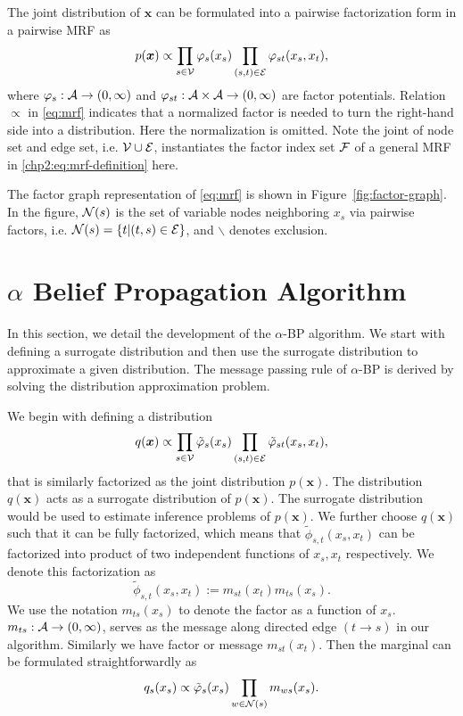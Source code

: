 The joint distribution of $\bm{x}$ can be formulated into a pairwise factorization form in a pairwise MRF as
\begin{equation}\label{eq:mrf}
  p(\bm{x}) \propto \prod_{{s\in \mathcal{V}}} \varphi_s(x_s) \prod_{(s,t) \in \mathcal{E}} \varphi_{st}(x_s, x_t),
\end{equation}
where $\varphi_{s}: \mathcal{A} \rightarrow (0, \infty)$ and $\varphi_{st}: \mathcal{A} \times \mathcal{A} \rightarrow (0, \infty)$ are factor potentials. Relation $\propto$ in \eqref{eq:mrf} indicates that a normalized factor is needed to turn the right-hand side into a distribution. Here the normalization is omitted. Note the joint of node set and edge set, i.e. $\mathcal{V} \cup \mathcal{E}$, instantiates the factor index set $\mathcal{F}$ of a general MRF in \eqref{chp2:eq:mrf-definition} here.

The factor graph representation of \eqref{eq:mrf} is shown in
Figure~\ref{fig:factor-graph}. In the figure, $\mathcal{N}(s)$ is the set of variable nodes neighboring $x_s$ via
pairwise factors, i.e. $\mathcal{N}(s) = \left\{ t|(t,s) \in \mathcal{E} \right\}$, and $\backslash$ denotes exclusion.

\section{$\alpha$ Belief Propagation Algorithm}\label{sec:alpha-bp-factor-refine}
In this section, we detail the development of the $\alpha$-BP algorithm. We start with defining a surrogate distribution and then use the surrogate distribution to approximate a given distribution. The message passing rule of $\alpha$-BP is derived by solving the distribution approximation problem.

We begin with defining a distribution
\begin{equation}
  q(\bm{x}) \propto \prod_{{s\in \mathcal{V}}} \tilde{\varphi}_s(x_s) \prod_{(s,t) \in \mathcal{E}} \tilde{\varphi}_{st}(x_s, x_t),
\end{equation}
that is similarly factorized as the joint distribution $p(\bm{x})$. The distribution $q(\bm{x})$ acts as a surrogate distribution of $p(\bm{x})$. The surrogate distribution would be used to estimate inference problems of $p(\bm{x})$. We further choose $q(\bm{x})$ such that it can be fully factorized, which means that $\tilde{\phi}_{s,t}(x_s, x_t)$ can be factorized into product of two independent functions of $x_s, x_t$ respectively. We denote this factorization as
\begin{equation}
  \tilde{\phi}_{s,t}(x_s, x_t) := m_{st}(x_t) m_{ts}(x_s).
\end{equation}
We use the notation $m_{ts}(x_s)$ to denote the factor as a function of $x_s$. $m_{ts}: \mathcal{A} \rightarrow (0, \infty)$, serves as the message along directed edge $(t \rightarrow s)$ in our algorithm. Similarly we have factor or message $m_{st}(x_t)$. Then the marginal can be formulated straightforwardly as
\begin{equation}
  q_s(x_s) \propto \tilde{\varphi}_s(x_s) \prod_{w\in \mathcal{N}(s)} m_{ws}(x_s).
\end{equation}

